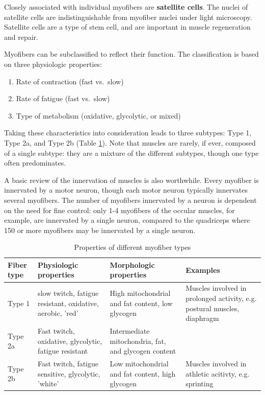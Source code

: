 \documentclass[openany]{book}
\providecommand{\tightlist}{%
  \setlength{\itemsep}{0pt}\setlength{\parskip}{0pt}}
\begin{document}
Closely associated with individual myofibers are \textbf{satellite
cells}. The nuclei of satellite cells are indistinguishable from
myofiber nuclei under light microscopy. Satellite cells are a type of
stem cell, and are important in muscle regeneration and repair.

Myofibers can be subclassified to reflect their function. The
classification is based on three physiologic properties:

\begin{enumerate}
\def\labelenumi{\arabic{enumi}.}
\tightlist
\item
  Rate of contraction (fast vs.~slow)
\item
  Rate of fatigue (fast vs.~slow)
\item
  Type of metabolism (oxidative, glycolytic, or mixed)
\end{enumerate}

Taking these characteristics into consideration leads to three subtypes:
Type 1, Type 2a, and Type 2b (Table \ref{tab:muscle-type}). Note that
muscles are rarely, if ever, composed of a single subtype: they are a
mixture of the different subtypes, though one type often predominates.

A basic review of the innervation of muscles is also worthwhile. Every
myofiber is innervated by a motor neuron, though each motor neuron
typically innervates several myofibers. The number of myofibers
innervated by a neuron is dependent on the need for fine control: only
1-4 myofibers of the occular muscles, for example, are innervated by a
single neuron, compared to the quadriceps where 150 or more myofibers
may be innervated by a single neuron.

\begin{table}[!h]

\caption{\label{tab:muscle-type}Properties of different myofiber types}
\centering
\begin{tabular}{l>{\raggedright\arraybackslash}p{10em}>{\raggedright\arraybackslash}p{10em}>{\raggedright\arraybackslash}p{10em}}
\toprule
Fiber type & Physiologic properties & Morphologic properties & Examples\\
\midrule
Type 1 & slow twitch, fatigue resistant, oxidative, aerobic, 'red' & High mitochondrial and fat content, low glycogen & Muscles involved in prolonged activity, e.g. postural muscles, diaphragm\\
Type 2a & Fast twitch, oxidative, glycolytic, fatigue resistant & Intermediate mitochondria, fat, and glycogen content & \\
Type 2b & Fast twitch, fatigue sensitive, glycolytic, 'white' & Low mitochondrial and fat content, high glycogen & Muscles involved in athletic acitivty, e.g. sprinting\\
\bottomrule
\end{tabular}
\end{table}
\end{document}

